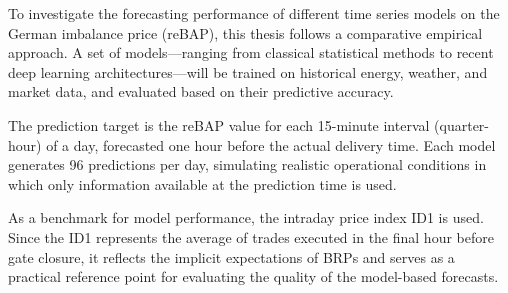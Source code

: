 \documentclass[class=scrbook, crop=false]{standalone}
\begin{document}


To investigate the forecasting performance of different time series models on the German imbalance price (reBAP), this thesis follows a comparative empirical approach. A set of models—ranging from classical statistical methods to recent deep learning architectures—will be trained on historical energy, weather, and market data, and evaluated based on their predictive accuracy.

The prediction target is the reBAP value for each 15-minute interval (quarter-hour) of a day, forecasted one hour before the actual delivery time. Each model generates 96 predictions per day, simulating realistic operational conditions in which only information available at the prediction time is used.

As a benchmark for model performance, the intraday price index ID1 is used. Since the ID1 represents the average of trades executed in the final hour before gate closure, it reflects the implicit expectations of BRPs and serves as a practical reference point for evaluating the quality of the model-based forecasts.
\end{document}
